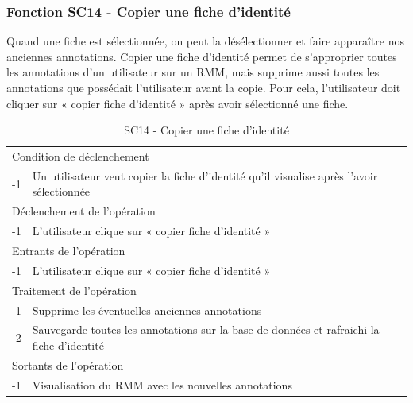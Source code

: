 \documentclass[a4paper]{article}
\begin{document}
\subsubsection{Fonction SC14 - Copier une fiche d’identité}
Quand une fiche est sélectionnée, on peut la désélectionner et faire apparaître nos anciennes annotations.
Copier une fiche d’identité permet de s’approprier toutes les annotations d’un utilisateur sur un RMM, mais supprime aussi toutes les annotations que possédait l’utilisateur avant la copie. Pour cela, l’utilisateur doit cliquer sur « copier fiche d’identité » après avoir sélectionné une fiche.\\

\begin{table}[H]
  \centering
   \small
	\begin{tabular}{|c|p{12cm}|}
   		\hline
   			\rowcolor{lightgray}\multicolumn{2}{|c|}{\textbf{SC14 - Copier une fiche d’identité}} \\
   		\hline
   			\multicolumn{2}{|l|}{Condition de d\'eclenchement} \\
   		\hline
   			-1 & Un utilisateur veut copier la fiche d’identité qu’il visualise après l'avoir sélectionnée\\
   		\hline
   			\multicolumn{2}{|l|}{D\'eclenchement de l'op\'eration} \\
   		\hline
   			-1 &  L’utilisateur clique sur « copier fiche d’identité »\\
   		\hline
   			\multicolumn{2}{|l|}{Entrants de l'op\'eration} \\
   		\hline
   			-1 &  L’utilisateur clique sur « copier fiche d’identité »\\
   		\hline
   			\multicolumn{2}{|l|}{Traitement de l'op\'eration} \\
  		\hline
   			-1 & Supprime les éventuelles anciennes annotations\\
			-2 & Sauvegarde toutes les annotations sur la base de données et rafraichi la fiche d’identité\\
   		\hline
   			\multicolumn{2}{|l|}{Sortants de l'op\'eration} \\
   		\hline
   			-1 & Visualisation du RMM avec les nouvelles annotations\\
   		\hline
	\end{tabular}
  \caption{SC14 - Copier une fiche d’identité}
  \normalsize
  \label{tab:copier_fiche}
\end{table}
\end{document}
